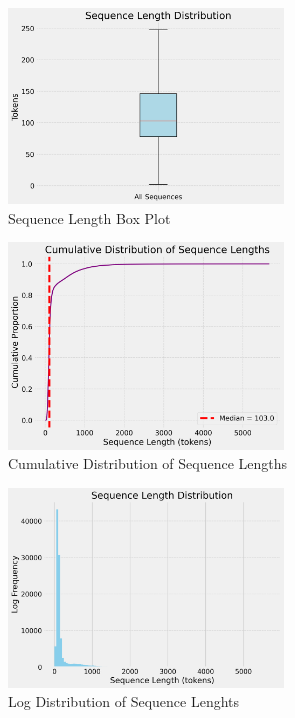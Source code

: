 \documentclass[a4paper,12pt]{extarticle}
\begin{document}
\begin{figure}[H]
    \centering
    \includegraphics[width=0.65\textwidth]{seq_len_box_plot.png}
    \caption{Sequence Length Box Plot}
    \label{fig:seq_len_box_plot}
\end{figure}
\begin{figure}[H]
    \centering
    \includegraphics[width=0.65\textwidth]{visualization_4096_REMI_train_manual_tokens_True_random_padding_True_cumulative_length_distribution.png}
    \caption{Cumulative Distribution of Sequence Lengths}
    \label{fig:cumulative_seq_len}
\end{figure}

\begin{figure}[H]
    \centering
    \includegraphics[width=0.65\textwidth]{visualization_4096_REMI_train_manual_tokens_True_random_padding_True_seq_length_distribution.png}
    \caption{Log Distribution of Sequence Lenghts}
    \label{fig:log_seq_len}
\end{figure}
\end{document}
